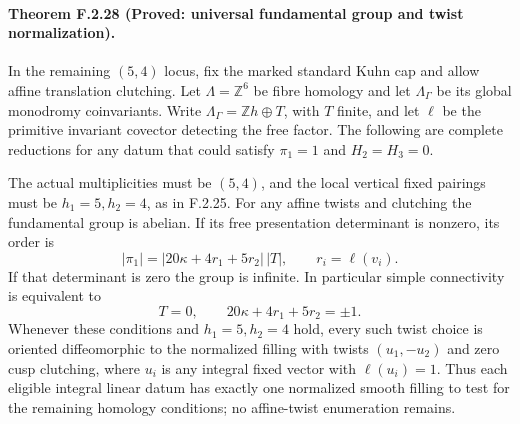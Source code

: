 \paragraph{Theorem F.2.28 (Proved: universal fundamental group and twist normalization).}
In the remaining $(5,4)$ locus, fix the marked standard Kuhn
cap and allow affine translation clutching.
Let $\Lambda=\mathbb Z^6$ be fibre homology and let
$\Lambda_\Gamma$ be its global monodromy coinvariants.
Write $\Lambda_\Gamma=\mathbb Zh\oplus T$, with $T$ finite,
and let $\ell$ be the primitive invariant covector detecting
the free factor.  The following are complete reductions for
any datum that could satisfy $\pi_1=1$ and $H_2=H_3=0$.

The actual multiplicities must be $(5,4)$, and the local
vertical fixed pairings must be $h_1=5,h_2=4$, as in F.2.25.
For any affine twists and clutching the fundamental group
is abelian.  If its free presentation determinant is nonzero,
its order is
\[
 |\pi_1|=|20\kappa+4r_1+5r_2|\,|T|,
 \qquad r_i=\ell(v_i).
 \tag{F.T11}
\]
If that determinant is zero the group is infinite.
In particular simple connectivity is equivalent to
\[
 T=0,\qquad 20\kappa+4r_1+5r_2=\pm1.
 \tag{F.T12}
\]
Whenever these conditions and $h_1=5,h_2=4$ hold, every
such twist choice is oriented diffeomorphic to the normalized
filling with twists $(u_1,-u_2)$ and zero cusp clutching,
where $u_i$ is any integral fixed vector with $\ell(u_i)=1$.
Thus each eligible integral linear datum has exactly one
normalized smooth filling to test for the remaining
homology conditions; no affine-twist enumeration remains.


